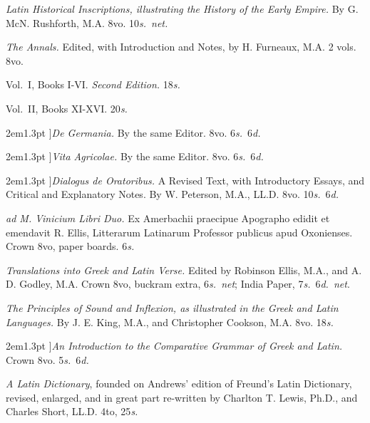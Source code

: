 \documentclass[12pt,oneside]{book}[2021/10/04]
\newcommand{\singleline}{
  \hspace*{0.33\textwidth}{\rule{0.33\textwidth}{0.4pt}}
}
\newcommand{\longdash}{\rule[.5ex]{2em}{1.3pt}
}
\newenvironment{advlist}{
  \begin{description}[leftmargin=1em, parsep=0.2ex, listparindent=1em,]
}{\end{description}}
\newenvironment{vollist}{
\begin{description}[nosep, topsep=-1ex, itemindent=-1em, leftmargin=2em]
}{\end{description}}
\newcommand{\¬}{\hphantom{0}}
\begin{document}
\begin{advlist}
\item[Rushforth.] \textit{Latin Historical
Inscriptions, illustrating the History of
the Early Empire.} By G. McN.
Rushforth, M.A. 8vo. 10\textit{s.}\ \textit{net.}

\item[Tacitus.] \textit{The Annals.} Edited,
with Introduction and Notes, by
H. Furneaux, M.A. 2 vols. 8vo.
\begin{vollist}
\item Vol.\ I, Books I-VI. \textit{Second Edition.}
18\textit{s.}
\item Vol.\ II, Books XI-XVI. 20\textit{s.}
\end{vollist}

\item[\longdash]\textit{De Germania.} By the
same Editor. 8vo. 6\textit{s.}\ 6\textit{d.}

\item[\longdash]\textit{Vita Agricolae.} By the
same Editor. 8vo. 6\textit{s.}\ 6\textit{d.}

\item[\longdash]\textit{Dialogus de Oratoribus.}
A Revised Text, with Introductory
Essays, and Critical and Explanatory
Notes. By W. Peterson, M.A.,
LL.D. 8vo. 10\textit{s.}\ 6\textit{d.}

\item[Velleius Paterculus] \textit{ad M.
Vinicium Libri Duo.} Ex Amerbachii
praecipue Apographo edidit et
emendavit R. Ellis, Litterarum
Latinarum Professor publicus apud
Oxonienses. Crown 8vo, paper
boards. 6\textit{s.}

\item \singleline

\item[Anthologia Oxoniensis, Nova.]
\textit{Translations into Greek and Latin Verse.}
Edited by Robinson Ellis, M.A.,
and A. D. Godley, M.A. Crown
8vo, buckram extra, 6\textit{s.}\ \textit{net}; India
Paper, 7\textit{s.}\ 6\textit{d.}\ \textit{net}.

\item[King and Cookson.] \textit{The Principles
of Sound and Inflexion, as illustrated
in the Greek and Latin Languages.}
By J. E. King, M.A., and Christopher
Cookson, M.A. 8vo. 18\textit{s.}

\item[\longdash]\textit{An Introduction to the
Comparative Grammar of Greek and
Latin.} Crown 8vo. 5\textit{s.}\ 6\textit{d.}

\item[Lewis and Short.] \textit{A Latin
Dictionary}, founded on Andrews'
edition of Freund's Latin Dictionary,
revised, enlarged, and in great
part re-written by Charlton T.
Lewis, Ph.D., and Charles Short,
LL.D. 4to, 25\textit{s.}


\end{advlist}
\end{document}
